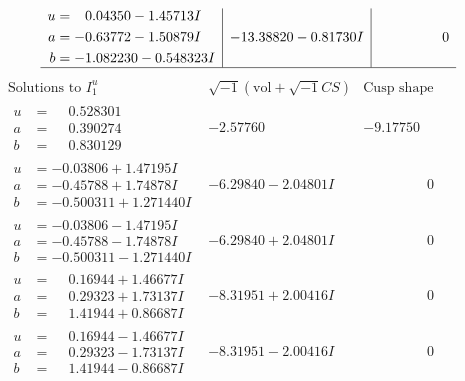 \documentclass[1p]{elsarticle_modified}
\theoremstyle{definition}
\newcommand{\I}{\sqrt{-1}}
\begin{document}
$$\begin{array}{c|c|c}
\begin{aligned}
u &= \phantom{-}0.04350 - 1.45713 I \\
a &= -0.63772 - 1.50879 I \\
b &= -1.082230 - 0.548323 I\end{aligned}
 & -13.38820 - 0.81730 I & \phantom{-0.000000 } 0\\
 \hline 
 \end{array}$$\newpage$$\begin{array}{c|c|c}  
\text{Solutions to }I^u_{1}& \I (\text{vol} + \sqrt{-1}CS) & \text{Cusp shape}\\
 \hline 
\begin{aligned}
u &= \phantom{-}0.528301\phantom{ +0.000000I} \\
a &= \phantom{-}0.390274\phantom{ +0.000000I} \\
b &= \phantom{-}0.830129\phantom{ +0.000000I}\end{aligned}
 & -2.57760\phantom{ +0.000000I} & -9.17750\phantom{ +0.000000I} \\ \hline\begin{aligned}
u &= -0.03806 + 1.47195 I \\
a &= -0.45788 + 1.74878 I \\
b &= -0.500311 + 1.271440 I\end{aligned}
 & -6.29840 - 2.04801 I & \phantom{-0.000000 } 0 \\ \hline\begin{aligned}
u &= -0.03806 - 1.47195 I \\
a &= -0.45788 - 1.74878 I \\
b &= -0.500311 - 1.271440 I\end{aligned}
 & -6.29840 + 2.04801 I & \phantom{-0.000000 } 0 \\ \hline\begin{aligned}
u &= \phantom{-}0.16944 + 1.46677 I \\
a &= \phantom{-}0.29323 + 1.73137 I \\
b &= \phantom{-}1.41944 + 0.86687 I\end{aligned}
 & -8.31951 + 2.00416 I & \phantom{-0.000000 } 0 \\ \hline\begin{aligned}
u &= \phantom{-}0.16944 - 1.46677 I \\
a &= \phantom{-}0.29323 - 1.73137 I \\
b &= \phantom{-}1.41944 - 0.86687 I\end{aligned}
 & -8.31951 - 2.00416 I & \phantom{-0.000000 } 0 \\ \hline\begin{aligned}

\end{aligned}
\end{array}$$
\end{document}
